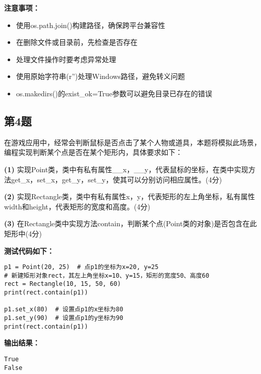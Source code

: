 \begin{mdframed}
  \textbf{注意事项：}
  \begin{itemize}
    \item 使用os.path.join()构建路径，确保跨平台兼容性
    \item 在删除文件或目录前，先检查是否存在
    \item 处理文件操作时要考虑异常处理
    \item 使用原始字符串(r'')处理Windows路径，避免转义问题
    \item os.makedirs()的exist\_ok=True参数可以避免目录已存在的错误
  \end{itemize}
\end{mdframed}

\subsection{第4题}
在游戏应用中，经常会判断鼠标是否点击了某个人物或道具，本题将模拟此场景，编程实现判断某个点是否在某个矩形内，具体要求如下：

\textbf{(1)} 实现Point类，类中有私有属性\_\_x，\_\_y，代表鼠标的坐标，在类中实现方法get\_x，set\_x，get\_y，set\_y，使其可以分别访问相应属性。(4分)

\textbf{(2)} 实现Rectangle类，类中有私有属性x，y，代表矩形的左上角坐标，私有属性width和height，代表矩形的宽度和高度。(4分)

\textbf{(3)} 在Rectangle类中实现方法contain，判断某个点(Point类的对象)是否包含在此矩形中(4分)

\textbf{测试代码如下：}
\begin{lstlisting}
p1 = Point(20, 25)  # 点p1的坐标为x=20, y=25
# 新建矩形对象rect，其左上角坐标x=10、y=15，矩形的宽度50、高度60
rect = Rectangle(10, 15, 50, 60)
print(rect.contain(p1))

p1.set_x(80)  # 设置点p1的x坐标为80
p1.set_y(90)  # 设置点p1的y坐标为90
print(rect.contain(p1))
\end{lstlisting}

\textbf{输出结果：}
\begin{lstlisting}
True
False
\end{lstlisting}

